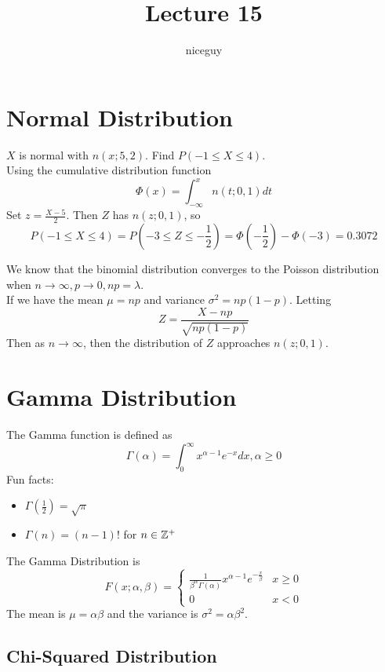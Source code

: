 \documentclass[12pt]{article}
\author{niceguy}
\title{Lecture 15}
\begin{document}
\maketitle

\section{Normal Distribution}

\begin{ex}
	$X$ is normal with $n(x;5,2)$. Find $P(-1 \leq X \leq 4)$. \\
	Using the cumulative distribution function
	$$\Phi(x) = \int_{-\infty}^x n(t;0,1)dt$$
	Set $z = \frac{X-5}{2}$. Then $Z$ has $n(z;0,1)$, so
	$$P(-1 \leq X \leq 4) = P\left(-3 \leq Z \leq -\frac{1}{2}\right) = \Phi\left(-\frac{1}{2}\right) - \Phi(-3) = 0.3072$$
\end{ex}

We know that the binomial distribution converges to the Poisson distribution when $n\rightarrow\infty,p\rightarrow0,np=\lambda$. \\
If we have the mean $\mu = np$ and variance $\sigma^2 = np(1-p)$.  Letting
$$Z = \frac{X-np}{\sqrt{np(1-p)}}$$
Then as $n\rightarrow\infty$, then the distribution of $Z$ approaches $n(z;0,1)$.

\section{Gamma Distribution}

\begin{defn}
	The Gamma function is defined as
	$$\Gamma(\alpha) = \int_0^\infty x^{\alpha-1}e^{-x}dx, \alpha \geq 0$$
	Fun facts:
	\begin{itemize}
		\item $\Gamma\left(\frac{1}{2}\right) = \sqrt{\pi}$
		\item $\Gamma(n) = (n-1)!$ for $n \in \mathbb{Z}^+$
	\end{itemize}
\end{defn}

The Gamma Distribution is
$$F(x;\alpha,\beta) = \begin{cases} \frac{1}{\beta^\alpha\Gamma(\alpha)}x^{\alpha-1}e^{-\frac{x}{\beta}} & x\geq0 \\ 0 & x < 0 \end{cases}$$
The mean is $\mu = \alpha\beta$ and the variance is $\sigma^2=\alpha\beta^2$.

\subsection{Chi-Squared Distribution}
\end{document}
